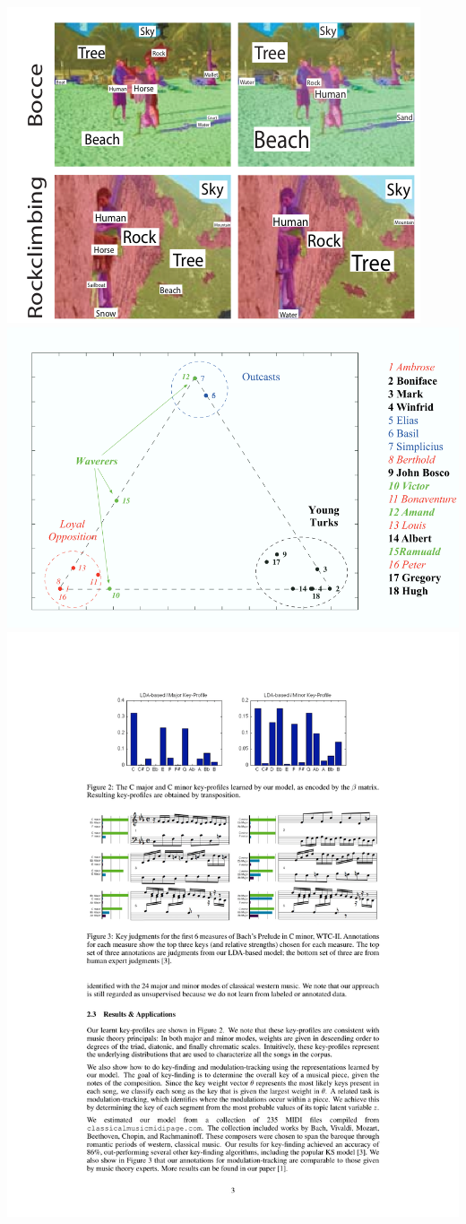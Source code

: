 \documentclass[compress]{beamer}
\begin{document}
\begin{frame}
\begin{columns}
\begin{center}
\includegraphics[width=0.8\linewidth]{topic_models/feifei} \\
\includegraphics[width=0.8\linewidth]{topic_models/socialnetworks} \\
\includegraphics[width=0.8\linewidth]{topic_models/hu}
\end{center}
\end{columns}
\end{frame}
\end{document}
